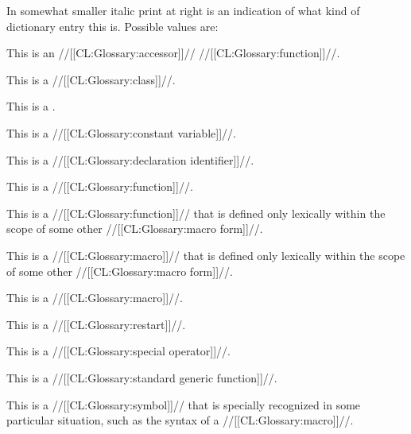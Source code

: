 In somewhat smaller italic print at right is an indication of what kind
of dictionary entry this is.  Possible values are:


\beginlist


This is an //[[CL:Glossary:accessor]]// //[[CL:Glossary:function]]//.


This is a //[[CL:Glossary:class]]//.


This is a .






This is a //[[CL:Glossary:constant variable]]//.


This is a //[[CL:Glossary:declaration identifier]]//.


This is a //[[CL:Glossary:function]]//.


This is a //[[CL:Glossary:function]]// that is defined only lexically within the scope of some
other //[[CL:Glossary:macro form]]//.


This is a //[[CL:Glossary:macro]]// that is defined only lexically within the scope of some
other //[[CL:Glossary:macro form]]//.


This is a //[[CL:Glossary:macro]]//.


This is a //[[CL:Glossary:restart]]//.


This is a //[[CL:Glossary:special operator]]//.


This is a //[[CL:Glossary:standard generic function]]//.


This is a //[[CL:Glossary:symbol]]// that is specially recognized in some particular situation,
such as the syntax of a //[[CL:Glossary:macro]]//.


